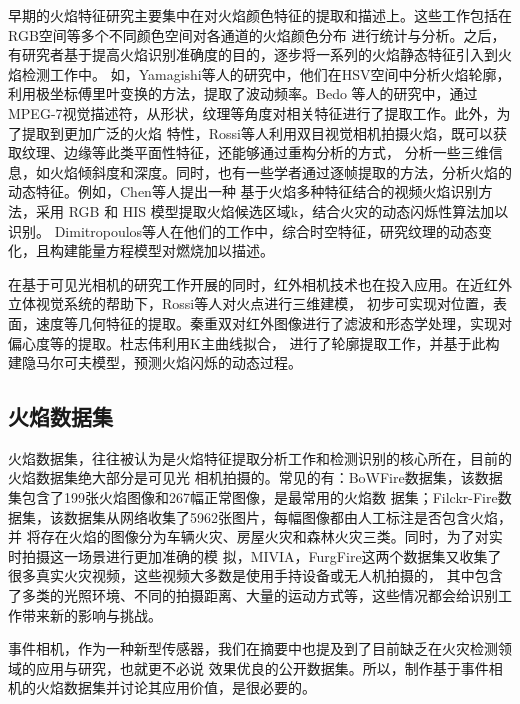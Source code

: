 早期的火焰特征研究主要集中在对火焰颜色特征的提取和描述上。这些工作包括在RGB空间等\cite{chen2004early,marbach2006image,rudz2013investigation}多个不同颜色空间对各通道的火焰颜色分布
进行统计与分析。之后，有研究者基于提高火焰识别准确度的目的，逐步将一系列的火焰静态特征引入到火焰检测工作中。
如，Yamagishi等人\cite{yamagishi2000contour}的研究中，他们在HSV空间中分析火焰轮廓，利用极坐标傅里叶变换的方法，提取了波动频率。Bedo
等人\cite{bedo2015techniques}的研究中，通过MPEG-7视觉描述符，从形状，纹理等角度对相关特征进行了提取工作。此外，为了提取到更加广泛的火焰
特性，Rossi等人\cite{rossi2011use}利用双目视觉相机拍摄火焰，既可以获取纹理、边缘等此类平面性特征，还能够通过重构分析的方式，
分析一些三维信息，如火焰倾斜度和深度。同时，也有一些学者通过逐帧提取的方法，分析火焰的动态特征。例如，Chen等人\cite{2011Application}提出一种
基于火焰多种特征结合的视频火焰识别方法，采用 RGB 和 HIS 模型提取火焰候选区域k，结合火灾的动态闪烁性算法加以识别。
Dimitropoulos等人\cite{dimitropoulos2014spatio}在他们的工作中，综合时空特征，研究纹理的动态变化，且构建能量方程模型对燃烧加以描述。

在基于可见光相机的研究工作开展的同时，红外相机技术也在投入应用。在近红外立体视觉系统的帮助下，Rossi等人\cite{rossi2013estimation}对火点进行三维建模，
初步可实现对位置，表面，速度等几何特征的提取。秦重双\cite{qcs}对红外图像进行了滤波和形态学处理，实现对偏心度等的提取。杜志伟\cite{dzw}利用K主曲线拟合，
进行了轮廓提取工作，并基于此构建隐马尔可夫模型，预测火焰闪烁的动态过程。

\subsection{火焰数据集}

火焰数据集，往往被认为是火焰特征提取分析工作和检测识别的核心所在，目前的火焰数据集绝大部分是可见光
相机拍摄的\cite{ko2012wildfire}。常见的有：BoWFire数据集，该数据集包含了199张火焰图像和267幅正常图像，是最常用的火焰数
据集\cite{chino2015bowfire}；Filckr-Fire数据集，该数据集从网络收集了5962张图片，每幅图像都由人工标注是否包含火焰，并
将存在火焰的图像分为车辆火灾、房屋火灾和森林火灾三类\cite{bedo2015techniques}。同时，为了对实时拍摄这一场景进行更加准确的模
拟，MIVIA，FurgFire这两个数据集又收集了很多真实火灾视频，这些视频大多数是使用手持设备或无人机拍摄的，
其中包含了多类的光照环境、不同的拍摄距离、大量的运动方式等，这些情况都会给识别工作带来新的影响与挑战。

事件相机，作为一种新型传感器，我们在摘要中也提及到了目前缺乏在火灾检测领域的应用与研究，也就更不必说
效果优良的公开数据集。所以，制作基于事件相机的火焰数据集并讨论其应用价值，是很必要的。

